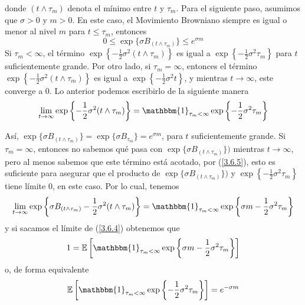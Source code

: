 \documentclass[11pt,notitlepage]{article}
\begin{document}
donde \((t\wedge \tau_m)\) denota el mínimo entre \(t\) y \(\tau_m\). Para el siguiente paso, asumimos que \(\sigma >0\) y \(m>0\). En este caso, el Movimiento Browniano siempre es igual o menor al nivel \(m\) para \(t\leq \tau_m\), entonces
\begin{equation} \label{3.6.5}
    0 \leq \exp\{\sigma B_{(t\wedge \tau_m)}\} \leq e^{\sigma m}
\end{equation}
Si \(\tau_m < \infty\), el término \(\exp\left\{-\frac{1}{2}\sigma^2(t\wedge \tau_m)\right\}\) es igual a  \(\exp\left\{-\frac{1}{2}\sigma^2 \tau_m\right\}\) para \(t\) suficientemente grande. Por otro lado, si \(\tau_m=\infty\), entonces el término \(\exp\left\{-\frac{1}{2}\sigma^2(t\wedge \tau_m)\right\}\) es igual a \(\exp\left\{-\frac{1}{2}\sigma^2 t\right\}\), y mientras \(t \to \infty\), este converge a \(0\). Lo anterior podemos escribirlo de la siguiente manera
\begin{equation*}
    \lim_{t \to \infty} \exp\left\{-\frac{1}{2}\sigma^2(t\wedge \tau_m)\right\}= \mathbbm{1}_{\tau_m < \infty} \exp\left\{-\frac{1}{2}\sigma^2 \tau_m\right\}
\end{equation*}

Así, \(\exp\{\sigma B_{(t\wedge \tau_m)}\}=\exp\{\sigma B_{\tau_m}\}= e^{\sigma m}\), para \(t\) suficientemente grande. Si \(\tau_m =\infty\), entonces no sabemos qué pasa con \(\exp\{\sigma B_{(t\wedge \tau_m)}\})\) mientras \(t \to \infty\), pero al menos sabemos que este término está acotado, por (\ref{3.6.5}), esto es suficiente para asegurar que el producto de \(\exp\{\sigma B_{(t\wedge \tau_m)}\})\) y \(\exp\left\{-\frac{1}{2}\sigma^2 \tau_m\right\}\) tiene límite \(0\), en este caso. Por lo cual, tenemos
\begin{equation*}
    \lim_{t \to \infty} \exp\left\{\sigma B_{(t\wedge \tau_m)}-\frac{1}{2}\sigma^2 (t\wedge \tau_m)\right\}=\mathbbm{1}_{\tau_m < \infty}  \exp\left\{\sigma m-\frac{1}{2}\sigma^2 \tau_m\right\}
\end{equation*}
y si sacamos el límite de (\ref{3.6.4}) obtenemos que 
\begin{equation*}
    1=\mathbb{E}\left[\mathbbm{1}_{\tau_m < \infty}\exp\left\{\sigma m-\frac{1}{2}\sigma^2 \tau_m\right\} \right]
\end{equation*}
o, de forma equivalente
\begin{equation} \label{3.6.6}
    \mathbb{E}\left[\mathbbm{1}_{\tau_m < \infty}\exp\left\{-\frac{1}{2}\sigma^2 \tau_m\right\} \right]= e^{-\sigma m}
\end{equation}
\end{document}
